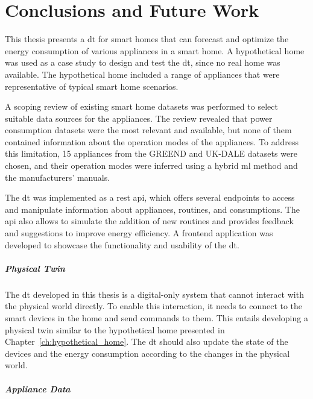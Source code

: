 \chapter{Conclusions and Future Work}\label{ch:conclusions}

This thesis presents a \acrshort{dt} for smart homes that can forecast and optimize the energy consumption of various appliances in a smart home. A hypothetical home was used as a case study to design and test the \acrshort{dt}, since no real home was available. The hypothetical home included a range of appliances that were representative of typical smart home scenarios.

A scoping review of existing smart home datasets was performed to select suitable data sources for the appliances. The review revealed that power consumption datasets were the most relevant and available, but none of them contained information about the operation modes of the appliances. To address this limitation, 15 appliances from the GREEND and UK-DALE datasets were chosen, and their operation modes were inferred using a hybrid \acrshort{ml} method and the manufacturers' manuals.

The \acrshort{dt} was implemented as a \acrshort{rest} \acrshort{api}, which offers several endpoints to access and manipulate information about appliances, routines, and consumptions. The \acrshort{api} also allows to simulate the addition of new routines and provides feedback and suggestions to improve energy efficiency. A frontend application was developed to showcase the functionality and usability of the \acrshort{dt}.

\paragraph{Physical Twin}

The \acrshort{dt} developed in this thesis is a digital-only system that cannot interact with the physical world directly. To enable this interaction, it needs to connect to the smart devices in the home and send commands to them. This entails developing a physical twin similar to the hypothetical home presented in Chapter~\ref{ch:hypothetical_home}. The \acrshort{dt} should also update the state of the devices and the energy consumption according to the changes in the physical world.

\paragraph{Appliance Data}

